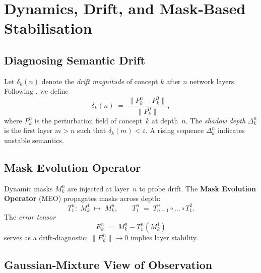 
\chapter{Dynamics, Drift, and Mask‑Based Stabilisation}\label{chap:dynamics}

\section{Diagnosing Semantic Drift}\label{sec:drift}

Let $\delta_k(n)$ denote the \emph{drift magnitude} of concept $k$ after $n$ network
layers.  Following \textcite{SSR_Draft3}, we define
\begin{equation}
  \delta_k(n)\;=\;\frac{\| P^n_k - P^0_k \|}{\|P^0_k\|},
\end{equation}
where $P^n_k$ is the perturbation field of concept~$k$ at depth~$n$.  The \emph{shadow
 depth} $\Delta^n_k$ is the first layer $m>n$ such that $\delta_k(m) < \varepsilon$.
A rising sequence $\Delta^n_k$ indicates unstable semantics.

\section{Mask Evolution Operator}\label{sec:MEO}

Dynamic masks $M^n_k$ are injected at layer~$n$ to probe drift.  The \textbf{Mask
 Evolution Operator} (MEO) propagates masks across depth:
\begin{equation}
  T^n_1:\;M^1_k\;\longmapsto\;M^n_k, \qquad
  T^n_1\;=\;T^n_{n-1}\circ\dots\circ T^2_1.
\end{equation}
The \emph{error tensor}
\begin{equation}
  E^n_k\;=\;M^n_k - T^n_1(M^1_k)
\end{equation}
serves as a drift‐diagnostic: $\|E^n_k\|\to0$ implies layer stability.

\section{Gaussian‐Mixture View of Observation}\label{sec:GMM}


